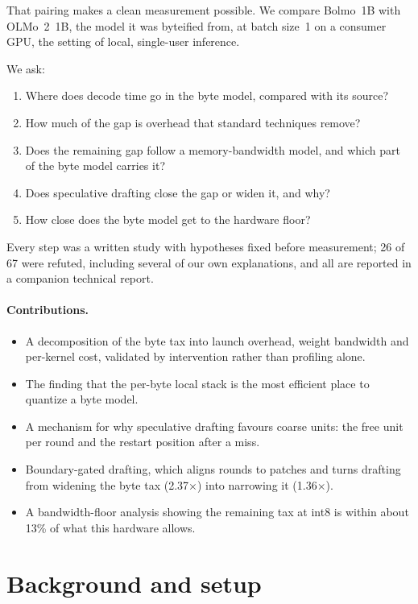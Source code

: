 \documentclass[11pt,a4paper]{article}
\newcommand{\x}{\ensuremath{\times}}
\begin{document}
That pairing makes a clean measurement possible. We compare Bolmo~1B with OLMo~2~1B, the model it was byteified from, at batch size~1 on a consumer GPU, the setting of local, single-user inference.

\noindent We ask:
\begin{enumerate}
  \item Where does decode time go in the byte model, compared with its source?
  \item How much of the gap is overhead that standard techniques remove?
  \item Does the remaining gap follow a memory-bandwidth model, and which part of the byte model carries it?
  \item Does speculative drafting close the gap or widen it, and why?
  \item How close does the byte model get to the hardware floor?
\end{enumerate}
Every step was a written study with hypotheses fixed before measurement; 26 of 67 were refuted, including several of our own explanations, and all are reported in a companion technical report.

\paragraph{Contributions.}
\begin{itemize}
  \item A decomposition of the byte tax into launch overhead, weight bandwidth and per-kernel cost, validated by intervention rather than profiling alone.
  \item The finding that the per-byte local stack is the most efficient place to quantize a byte model.
  \item A mechanism for why speculative drafting favours coarse units: the free unit per round and the restart position after a miss.
  \item Boundary-gated drafting, which aligns rounds to patches and turns drafting from widening the byte tax (2.37\x) into narrowing it (1.36\x).
  \item A bandwidth-floor analysis showing the remaining tax at int8 is within about 13\% of what this hardware allows.
\end{itemize}

\section{Background and setup}
\end{document}
